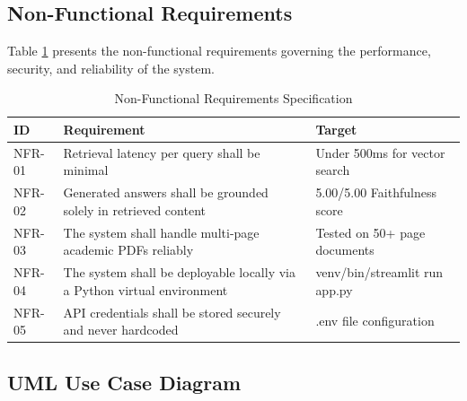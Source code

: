 \subsection{Non-Functional Requirements}

Table \ref{tab:nfr} presents the non-functional requirements governing the performance, security, and reliability of the system.

\begin{table}[H]

\centering

\caption{Non-Functional Requirements Specification}

\label{tab:nfr}

\begin{tabular}{|p{1.2cm}|p{8cm}|p{3.5cm}|}

\hline

\textbf{ID} & \textbf{Requirement} & \textbf{Target} \\

\hline

NFR-01 & Retrieval latency per query shall be minimal & Under 500ms for vector search \\

\hline

NFR-02 & Generated answers shall be grounded solely in retrieved content & 5.00/5.00 Faithfulness score \\

\hline

NFR-03 & The system shall handle multi-page academic PDFs reliably & Tested on 50+ page documents \\

\hline

NFR-04 & The system shall be deployable locally via a Python virtual environment & venv/bin/streamlit run app.py \\

\hline

NFR-05 & API credentials shall be stored securely and never hardcoded & .env file configuration \\

\hline

\end{tabular}

\end{table}

\subsection{UML Use Case Diagram}

